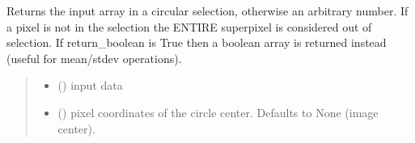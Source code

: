 \documentclass[letterpaper,10pt,english]{sphinxmanual}
\begin{document}

\begin{fulllineitems}
\label{\detokenize{micropolarray.processing:micropolarray.processing.nrgf.roi_from_polar}}
\pysigstartsignatures
{}
\pysigstopsignatures
\sphinxAtStartPar
Returns the input array in a circular selection, otherwise an arbitrary number. If a pixel is not in the selection the ENTIRE superpixel is considered out of selection. If return\_boolean is True then a boolean array is returned instead (useful for mean/stdev operations).
\begin{quote}\begin{description}
\begin{itemize}
\item {} 
\sphinxAtStartPar
{} () \textendash{} input data

\item {} 
\sphinxAtStartPar
{} (\sphinxstyleliteralemphasis{\sphinxupquote{, }}) \textendash{} pixel coordinates of the circle center. Defaults to None (image center).


\end{itemize}
\end{description}
\end{quote}
\end{fulllineitems}
\end{document}
